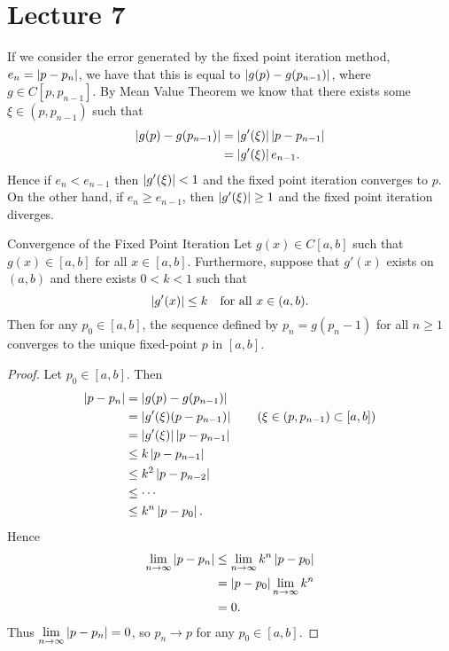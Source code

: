 \documentclass[class=article, crop=false]{standalone}
\begin{document}
  \section{Lecture 7}
  If we consider the error generated by the fixed point iteration method, $e_n = \left\lvert p - p_n \right\rvert$, we have that this is equal to $\left\lvert g(p) - g(p_{n - 1}) \right\rvert$, where $g\in C[p, p_{n - 1}]$. By Mean Value Theorem we know that there exists some $\xi\in (p, p_{n - 1})$ such that
  \begin{align*}
    \left\lvert g(p) - g(p_{n - 1}) \right\rvert &= \left\lvert g'(\xi) \right\rvert \left\lvert p - p_{n - 1} \right\rvert \\
                              &= \left\lvert g'(\xi) \right\rvert e_{n - 1}.
  \end{align*}
  Hence if $e_n < e_{n - 1}$ then $\left\lvert g'(\xi) \right\rvert < 1$ and the fixed point iteration converges to $p$. On the other hand, if $e_n\geq e_{n - 1}$, then $\left\lvert g'(\xi) \right\rvert\geq 1$ and the fixed point iteration diverges.
  \begin{theorem}{Convergence of the Fixed Point Iteration}
    Let $g(x)\in C[a, b]$ such that $g(x)\in [a, b]$ for all $x\in [a, b]$. Furthermore, suppose that $g'(x)$ exists on $(a, b)$ and there exists $0 < k < 1$ such that
    \[
      \left\lvert g'(x) \right\rvert\leq k\quad\text{for all }x\in (a, b).
    \]
    Then for any $p_0\in [a, b]$, the sequence defined by $p_n = g(p_n - 1)$ for all $n\geq 1$ converges to the unique fixed-point $p$ in $[a, b]$.
    \begin{proof}
      Let $p_0\in [a, b]$. Then
      \begin{align*}
        \abs{p - p_n} &= \abs{g(p) - g(p_{n - 1})} \\
                      &= \abs{g'(\xi)(p - p_{n - 1})} \tag{$\xi\in (p, p_{n - 1})\subset [a, b]$} \\
                      &= \abs{g'(\xi)}\abs{p - p_{n - 1}} \\
                      &\leq k\abs{p - p_{n - 1}} \\
                      &\leq k^2 \abs{p - p_{n - 2}} \\
                      &\leq \dotsb \\
                      &\leq k^n \abs{p - p_0}.
      \end{align*}
      Hence
      \begin{align*}
        \lim_{n\to \infty} \left\lvert p - p_n \right\rvert &\leq \lim_{n\to \infty} k^n\left\lvert p - p_0 \right\rvert \\
                                         &= \left\lvert p - p_0 \right\rvert\lim_{n\to \infty} k^n \\
                                         &= 0.
      \end{align*}
      Thus $\lim\limits_{n\to \infty} \left\lvert p - p_n \right\rvert = 0$, so $p_n\to p$ for any $p_0\in [a, b]$.
    \end{proof}
  \end{theorem}
\end{document}

